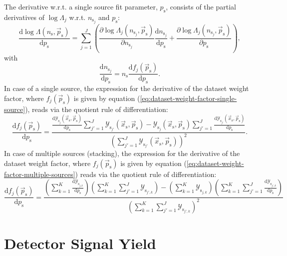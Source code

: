 \documentclass{article}
\newcommand{\ns}{n_{\mathrm{s}}}
\newcommand{\nsj}{n_{\mathrm{s}_j}}
\newcommand{\ps}{\vec{p}_{\mathrm{s}}}
\newcommand{\xs}{\vec{x}_{\mathrm{s}}}
\begin{document}
The derivative w.r.t. a single source fit parameter, $p_{\mathrm{s}}$, consists
of the partial derivatives of $\log \Lambda_j$ w.r.t. $n_{\mathrm{s}_j}$ and
$p_{\mathrm{s}}$:
\begin{equation}
 \frac{\mathrm{d} \log \Lambda(\ns,\ps)}{\mathrm{d} p_{\mathrm{s}}} = \sum_{j=1}^{J} \left( \frac{\partial \log \Lambda_j(\nsj,\ps)}{\partial \nsj} \frac{\mathrm{d} \nsj}{\mathrm{d} p_{\mathrm{s}}} + \frac{\partial \log \Lambda_j(\nsj,\ps)}{\partial p_{\mathrm{s}}} \right),
\end{equation}
with
\begin{equation}
 \frac{\mathrm{d} \nsj}{\mathrm{d} p_{\mathrm{s}}} = \ns \frac{\mathrm{d} f_j(\ps)}{\mathrm{d} p_{\mathrm{s}}}.
\end{equation}
In case of a single source, the expression for the derivative of the dataset
weight factor, where $f_j(\ps)$ is given by equation (\ref{eq:dataset-weight-factor-single-source}),
reads via the quotient rule of differentiation:
\begin{equation}
\frac{\mathrm{d}f_j(\ps)}{\mathrm{d}p_{\mathrm{s}}} = \frac{\frac{\mathrm{d}\mathcal{Y}_{\mathrm{s}_j}(\xs,\ps)}{\mathrm{d}p_{\mathrm{s}}} \sum_{j'=1}^{J}\mathcal{Y}_{\mathrm{s}_{j'}}(\xs,\ps) - \mathcal{Y}_{\mathrm{s}_j}(\xs,\ps) \sum_{j'=1}^{J} \frac{\mathrm{d}\mathcal{Y}_{\mathrm{s}_{j'}}(\xs,\ps)}{\mathrm{d}p_{\mathrm{s}}} }{\left( \sum_{j'=1}^{J} \mathcal{Y}_{\mathrm{s}_{j'}}(\xs,\ps) \right)^2}.
\end{equation}
In case of multiple sources (stacking), the expression for the derivative of the
dataset weight factor, where $f_j(\ps)$ is given by equation
(\ref{eq:dataset-weight-factor-multiple-sources}) reads via the quotient rule of
differentiation:
\begin{equation}
 \frac{\mathrm{d} f_j(\ps)}{\mathrm{d}p_{\mathrm{s}}} =
    \frac{\left(\sum_{k=1}^{K} \frac{\mathrm{d}\mathcal{Y}_{\mathrm{s}_{j,k}}}{\mathrm{d}p_{\mathrm{s}}}\right) \left(\sum_{k=1}^{K}\sum_{j'=1}^{J}\mathcal{Y}_{\mathrm{s}_{j',k}}\right) - \left(\sum_{k=1}^{K}\mathcal{Y}_{\mathrm{s}_{j,k}}\right)\left(\sum_{k=1}^{K}\sum_{j'=1}^{J}\frac{\mathrm{d}\mathcal{Y}_{\mathrm{s}_{j',k}}}{\mathrm{d}p_{\mathrm{s}}}\right)}
         {\left(\sum_{k=1}^{K}\sum_{j'=1}^{J}\mathcal{Y}_{\mathrm{s}_{j',k}} \right)^2}
\end{equation}

\section{Detector Signal Yield}
\label{sec:detsigyield}
\end{document}
